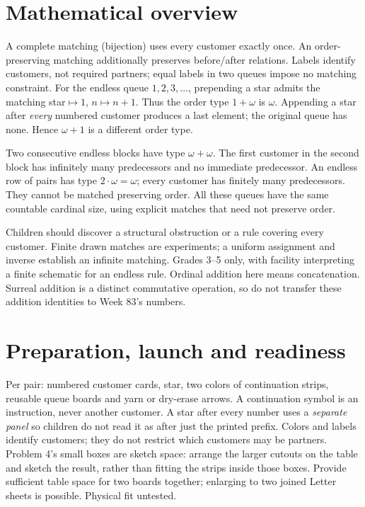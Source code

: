 \documentclass[11pt,letterpaper]{article}
\begin{document}
\section*{Mathematical overview}
A complete matching (bijection) uses every customer exactly once. An order-preserving matching additionally preserves before/after relations. Labels identify customers, not required partners; equal labels in two queues impose no matching constraint. For the endless queue $1,2,3,\ldots$, prepending a star admits the matching star$\mapsto1$, $n\mapsto n+1$. Thus the order type $1+\omega$ is $\omega$. Appending a star after \emph{every} numbered customer produces a last element; the original queue has none. Hence $\omega+1$ is a different order type.

Two consecutive endless blocks have type $\omega+\omega$. The first customer in the second block has infinitely many predecessors and no immediate predecessor. An endless row of pairs has type $2\cdot\omega=\omega$; every customer has finitely many predecessors. They cannot be matched preserving order. All these queues have the same countable cardinal size, using explicit matches that need not preserve order.

Children should discover a structural obstruction or a rule covering every customer. Finite drawn matches are experiments; a uniform assignment and inverse establish an infinite matching. Grades 3--5 only, with facility interpreting a finite schematic for an endless rule. Ordinal addition here means concatenation. Surreal addition is a distinct commutative operation, so do not transfer these addition identities to Week 83's numbers.
\newpage
\section*{Preparation, launch and readiness}
Per pair: numbered customer cards, star, two colors of continuation strips, reusable queue boards and yarn or dry-erase arrows. A continuation symbol is an instruction, never another customer. A star after every number uses a \emph{separate panel} so children do not read it as after just the printed prefix. Colors and labels identify customers; they do not restrict which customers may be partners. Problem 4's small boxes are sketch space: arrange the larger cutouts on the table and sketch the result, rather than fitting the strips inside those boxes. Provide sufficient table space for two boards together; enlarging to two joined Letter sheets is possible. Physical fit untested.
\end{document}

